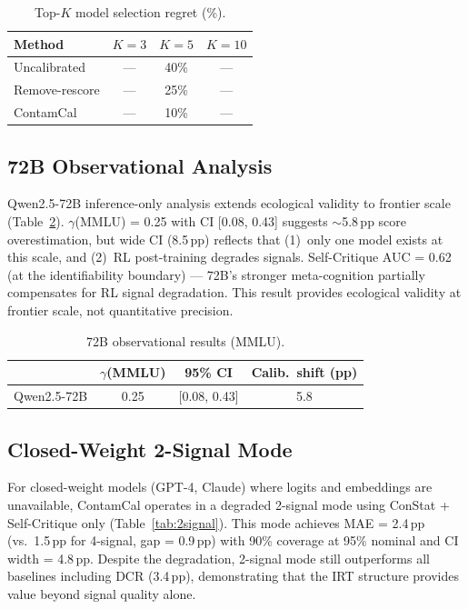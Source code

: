 \documentclass[letterpaper]{article}
\begin{document}
\begin{table}[t]
\centering
\caption{Top-$K$ model selection regret (\%).}
\label{tab:regret}
\begin{tabular}{lccc}
\toprule
Method & $K=3$ & $K=5$ & $K=10$ \\
\midrule
Uncalibrated     & --- & 40\% & --- \\
Remove-rescore   & --- & 25\% & --- \\
ContamCal        & --- & 10\% & --- \\
\bottomrule
\end{tabular}
\end{table}

\subsection{72B Observational Analysis}
\label{sec:72b}

Qwen2.5-72B inference-only analysis extends ecological validity to frontier scale (Table~\ref{tab:72b}).
$\gamma$(MMLU) = 0.25 with CI [0.08, 0.43] suggests $\sim$5.8\,pp score overestimation, but wide CI (8.5\,pp) reflects that (1)~only one model exists at this scale, and (2)~RL post-training degrades signals.
Self-Critique AUC = 0.62 (at the identifiability boundary) --- 72B's stronger meta-cognition partially compensates for RL signal degradation.
This result provides ecological validity at frontier scale, not quantitative precision.

\begin{table}[t]
\centering
\caption{72B observational results (MMLU).}
\label{tab:72b}
\begin{tabular}{lccc}
\toprule
& $\gamma$(MMLU) & 95\% CI & Calib.\ shift (pp) \\
\midrule
Qwen2.5-72B & 0.25 & [0.08, 0.43] & 5.8 \\
\bottomrule
\end{tabular}
\end{table}

\subsection{Closed-Weight 2-Signal Mode}
\label{sec:2signal}

For closed-weight models (GPT-4, Claude) where logits and embeddings are unavailable, ContamCal operates in a degraded 2-signal mode using ConStat + Self-Critique only (Table~\ref{tab:2signal}).
This mode achieves MAE = 2.4\,pp (vs.\ 1.5\,pp for 4-signal, gap = 0.9\,pp) with 90\% coverage at 95\% nominal and CI width = 4.8\,pp.
Despite the degradation, 2-signal mode still outperforms all baselines including DCR (3.4\,pp), demonstrating that the IRT structure provides value beyond signal quality alone.
\end{document}
